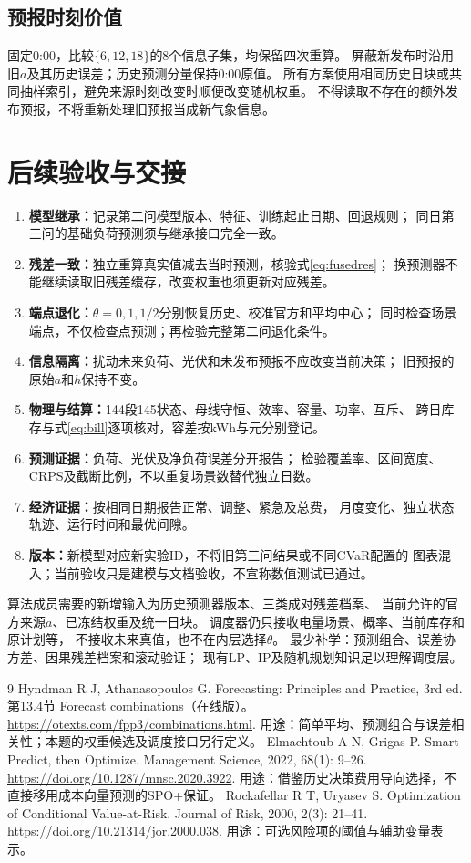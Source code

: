 \documentclass[UTF8,11pt]{ctexart}
\begin{document}
\subsection{预报时刻价值}
固定0:00，比较$\{6,12,18\}$的8个信息子集，均保留四次重算。
屏蔽新发布时沿用旧$a$及其历史误差；历史预测分量保持0:00原值。
所有方案使用相同历史日块或共同抽样索引，避免来源时刻改变时顺便改变随机权重。
不得读取不存在的额外发布预报，不将重新处理旧预报当成新气象信息。

\section{后续验收与交接}
\begin{enumerate}
 \item \textbf{模型继承：}记录第二问模型版本、特征、训练起止日期、回退规则；
 同日第三问的基础负荷预测须与继承接口完全一致。
 \item \textbf{残差一致：}独立重算真实值减去当时预测，核验式\eqref{eq:fusedres}；
 换预测器不能继续读取旧残差缓存，改变权重也须更新对应残差。
 \item \textbf{端点退化：}$\theta=0,1,1/2$分别恢复历史、校准官方和平均中心；
 同时检查场景端点，不仅检查点预测；再检验完整第二问退化条件。
 \item \textbf{信息隔离：}扰动未来负荷、光伏和未发布预报不应改变当前决策；
 旧预报的原始$a$和$h$保持不变。
 \item \textbf{物理与结算：}144段145状态、母线守恒、效率、容量、功率、互斥、
 跨日库存与式\eqref{eq:bill}逐项核对，容差按kWh与元分别登记。
 \item \textbf{预测证据：}负荷、光伏及净负荷误差分开报告；
 检验覆盖率、区间宽度、CRPS及截断比例，不以重复场景数替代独立日数。
 \item \textbf{经济证据：}按相同日期报告正常、调整、紧急及总费，
 月度变化、独立状态轨迹、运行时间和最优间隙。
 \item \textbf{版本：}新模型对应新实验ID，不将旧第三问结果或不同CVaR配置的
 图表混入；当前验收只是建模与文档验收，不宣称数值测试已通过。
\end{enumerate}
算法成员需要的新增输入为历史预测器版本、三类成对残差档案、
当前允许的官方来源$a$、已冻结权重及统一日块。
调度器仍只接收电量场景、概率、当前库存和原计划等，
不接收未来真值，也不在内层选择$\theta$。
最少补学：预测组合、误差协方差、因果残差档案和滚动验证；
现有LP、IP及随机规划知识足以理解调度层。

\begingroup\small
\begin{thebibliography}{9}
Hyndman R J, Athanasopoulos G.
Forecasting: Principles and Practice, 3rd ed.
第13.4节 Forecast combinations（在线版）。
\url{https://otexts.com/fpp3/combinations.html}.
用途：简单平均、预测组合与误差相关性；本题的权重候选及调度接口另行定义。
Elmachtoub A N, Grigas P. Smart Predict, then Optimize.
Management Science, 2022, 68(1): 9--26.
\url{https://doi.org/10.1287/mnsc.2020.3922}.
用途：借鉴历史决策费用导向选择，不直接移用成本向量预测的SPO+保证。
Rockafellar R T, Uryasev S. Optimization of Conditional Value-at-Risk.
Journal of Risk, 2000, 2(3): 21--41.
\url{https://doi.org/10.21314/jor.2000.038}.
用途：可选风险项的阈值与辅助变量表示。
\end{thebibliography}
\endgroup
\end{document}
